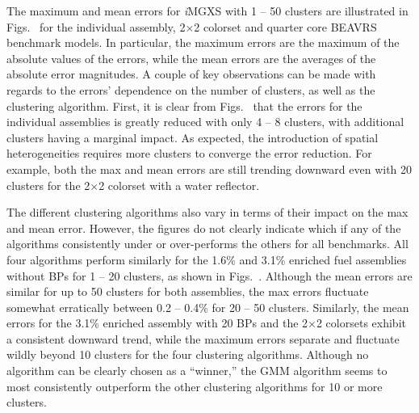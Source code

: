 The maximum and mean errors for \textit{i}\ac{MGXS} with 1 -- 50 clusters are illustrated in Figs.~ for the individual assembly, 2$\times$2 colorset and quarter core \ac{BEAVRS} benchmark models. In particular, the maximum errors are the maximum of the absolute values of the errors, while the mean errors are the averages of the absolute error magnitudes. A couple of key observations can be made with regards to the errors' dependence on the number of clusters, as well as the clustering algorithm. First, it is clear from Figs.~ that the errors for the individual assemblies is greatly reduced with only 4 -- 8 clusters, with additional clusters having a marginal impact. As expected, the introduction of spatial heterogeneities requires more clusters to converge the error reduction. For example, both the max and mean errors are still trending downward even with 20 clusters for the 2$\times$2 colorset with a water reflector.


The different clustering algorithms also vary in terms of their impact on the max and mean error. However, the figures do not clearly indicate which if any of the algorithms consistently under or over-performs the others for all benchmarks. All four algorithms perform similarly for the 1.6\% and 3.1\% enriched fuel assemblies without \acp{BP} for 1 -- 20 clusters, as shown in Figs.~. Although the mean errors are similar for up to 50 clusters for both assemblies, the max errors fluctuate somewhat erratically between 0.2 -- 0.4\% for 20 -- 50 clusters. Similarly, the mean errors for the 3.1\% enriched assembly with 20 \acp{BP} and the 2$\times$2 colorsets exhibit a consistent downward trend, while the maximum errors separate and fluctuate wildly beyond 10 clusters for the four clustering algorithms. Although no algorithm can be clearly chosen as a ``winner,'' the \ac{GMM} algorithm seems to most consistently outperform the other clustering algorithms for 10 or more clusters. 

